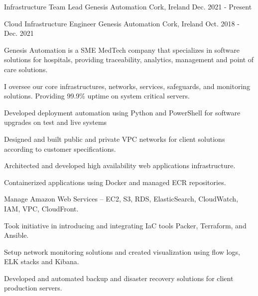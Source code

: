 


\begin{cventries}

\cventry
{Infrastructure Team Lead}
{Genesis Automation}
{Cork, Ireland}
{Dec. 2021 - Present}
{
\begin{cvitems}
\end{cvitems}
}

\cventry
{Cloud Infrastructure Engineer}
{Genesis Automation}
{Cork, Ireland}
{Oct. 2018 - Dec. 2021}
{
\begin{cvitems}
\item {Genesis Automation is a SME MedTech company that specializes in software solutions for hospitals, providing traceability, analytics, management and point of care solutions.}
\item {I oversee our core infrastructures, networks, services, safeguards, and monitoring solutions. Providing 99.9\% uptime on system critical servers.}
\item {Developed deployment automation using Python and PowerShell for software upgrades on test and live systems}
\item {Designed and built public and private VPC networks for client solutions according to customer specifications.}
\item {Architected and developed high availability web applications infrastructure.}
\item {Containerized applications using Docker and managed ECR repositories.}
\item {Manage Amazon Web Services – EC2, S3, RDS, ElasticSearch, CloudWatch, IAM, VPC, CloudFront.}
\item {Took initiative in introducing and integrating IaC tools Packer, Terraform, and Ansible.}
\item {Setup network monitoring solutions and created visualization using flow logs, ELK stacks and Kibana.}
\item {Developed and automated backup and disaster recovery solutions for client production servers.}
\end{cvitems}
}



\end{cventries}
